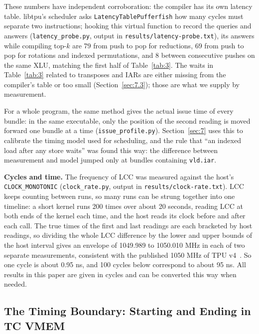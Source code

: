 \documentclass[sigconf,nonacm,balance=false]{acmart}
\newcommand{\code}[1]{\texttt{#1}}
\begin{document}
These numbers have independent corroboration: the compiler has its own latency table. libtpu's scheduler asks \code{Latency\allowbreak{}Table\allowbreak{}Pufferfish} how many cycles must separate two instructions; hooking this virtual function to record the queries and answers (\code{latency\_\allowbreak{}probe.\allowbreak{}py}, output in \code{results/\allowbreak{}latency-probe.\allowbreak{}txt}), its answers while compiling top-$k$ are 79 from push to pop for reductions, 69 from push to pop for rotations and indexed permutations, and 8 between consecutive pushes on the same XLU, matching the first half of Table~\ref{tab:3}. The waits in Table~\ref{tab:3} related to transposes and IARs are either missing from the compiler's table or too small (Section~\ref{sec:7.3}); those are what we supply by measurement.

For a whole program, the same method gives the actual issue time of every bundle: in the same executable, only the position of the second reading is moved forward one bundle at a time (\code{issue\_\allowbreak{}profile.\allowbreak{}py}). Section~\ref{sec:7} uses this to calibrate the timing model used for scheduling, and the rule that ``an indexed load after any store waits'' was found this way: the difference between measurement and model jumped only at bundles containing \code{vld.\allowbreak{}iar}.

\textbf{Cycles and time.} The frequency of LCC was measured against the host's \code{CLOCK\_\allowbreak{}MONOTONIC} (\code{clock\_\allowbreak{}rate.\allowbreak{}py}, output in \code{results/\allowbreak{}clock-rate.\allowbreak{}txt}). LCC keeps counting between runs, so many runs can be strung together into one timeline: a short kernel runs 200 times over about 20 seconds, reading LCC at both ends of the kernel each time, and the host reads its clock before and after each call. The true times of the first and last readings are each bracketed by host readings, so dividing the whole LCC difference by the lower and upper bounds of the host interval gives an envelope of 1049.989 to 1050.010 MHz in each of two separate measurements, consistent with the published 1050 MHz of TPU v4~\cite{jouppi2023tpuv4}. So one cycle is about 0.95 ns, and 100 cycles below correspond to about 95 ns. All results in this paper are given in cycles and can be converted this way when needed.

\subsection{The Timing Boundary: Starting and Ending in TC VMEM}
\label{sec:3.4}
\end{document}
